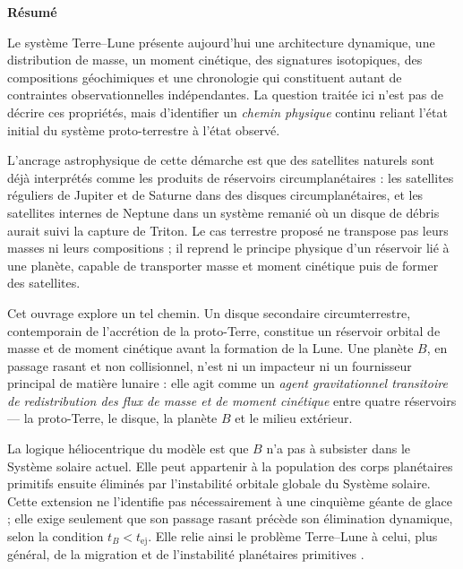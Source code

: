 \documentclass[11pt,a4paper,openany]{report}
\begin{document}
\thispagestyle{plain}
\begin{center}{\Large\bfseries Résumé}\end{center}
\medskip

Le système Terre--Lune présente aujourd'hui une architecture dynamique, une distribution de
masse, un moment cinétique, des signatures isotopiques, des compositions géochimiques et une
chronologie qui constituent autant de contraintes observationnelles indépendantes. La question
traitée ici n'est pas de décrire ces propriétés, mais d'identifier un \emph{chemin physique}
continu reliant l'état initial du système proto-terrestre à l'état observé.

L'ancrage astrophysique de cette démarche est que des satellites naturels sont déjà interprétés
comme les produits de réservoirs circumplanétaires : les satellites réguliers de Jupiter et de
Saturne dans des disques circumplanétaires, et les satellites internes de Neptune dans un système
remanié où un disque de débris aurait suivi la capture de Triton. Le cas terrestre proposé ne
transpose pas leurs masses ni leurs compositions ; il reprend le principe physique d'un réservoir
lié à une planète, capable de transporter masse et moment cinétique puis de former des satellites.

Cet ouvrage explore un tel chemin. Un disque secondaire circumterrestre, contemporain de
l'accrétion de la proto-Terre, constitue un réservoir orbital de masse et de moment cinétique
avant la formation de la Lune. Une planète $B$, en passage rasant et non collisionnel, n'est ni un
impacteur ni un fournisseur principal de matière lunaire : elle agit comme un \emph{agent
gravitationnel transitoire de redistribution des flux de masse et de moment cinétique} entre
quatre réservoirs --- la proto-Terre, le disque, la planète $B$ et le milieu extérieur.

La logique héliocentrique du modèle est que $B$ n'a pas à subsister dans le Système solaire
actuel. Elle peut appartenir à la population des corps planétaires primitifs ensuite éliminés par
l'instabilité orbitale globale du Système solaire. Cette extension ne l'identifie pas nécessairement
à une cinquième géante de glace ; elle exige seulement que son passage rasant précède son
élimination dynamique, selon la condition $t_B<t_{\mathrm{ej}}$. Elle relie ainsi le problème
Terre--Lune à celui, plus général, de la migration et de l'instabilité planétaires primitives
\cite{Tsiganis2005,Gomes2005,Nesvorny2011,NesvornyMorbidelli2012,Liu2022,Clement2018}.
\end{document}
